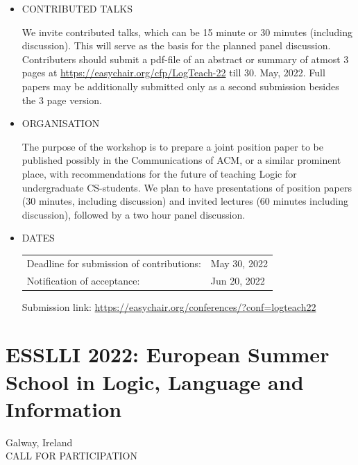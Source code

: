 \documentclass[prodmode,acmtecs]{acmsmall} %
\begin{document}
\begin{itemize}
\item  CONTRIBUTED TALKS 
 
  We invite contributed talks, which can be 15 minute or 30 minutes (including discussion). This will serve as the basis for the planned panel discussion. Contributers should submit a pdf-file of an abstract or summary of atmost 3 pages at \href{https://easychair.org/cfp/LogTeach-22}{https://easychair.org/cfp/LogTeach-22} till 30. May, 2022. Full papers may be additionally submitted only as a second submission besides the 3 page version. 
 
\item  ORGANISATION  
 
  The purpose of the workshop is to prepare a joint position paper to be published possibly in the Communications of ACM, or a similar prominent place, with recommendations for the future of teaching Logic for undergraduate CS-students. We plan to have presentations of position papers (30 minutes, including discussion) and invited lectures (60 minutes including discussion), followed by a two hour panel discussion. 
 
\item  DATES    
 
\begin{tabulary}{\linewidth}{LL}Deadline for submission of contributions:  & May 30, 2022 \\
Notification of acceptance:  & Jun 20, 2022 \\
\end{tabulary}
 
  Submission link: \href{https://easychair.org/conferences/?conf=logteach22}{https://easychair.org/conferences/?conf=logteach22}  
 
\end{itemize}\section{ESSLLI 2022: European Summer School in Logic, Language and Information}\label{ESSLLI2022}  Galway, Ireland \\ 
CALL FOR PARTICIPATION 
\end{document}
